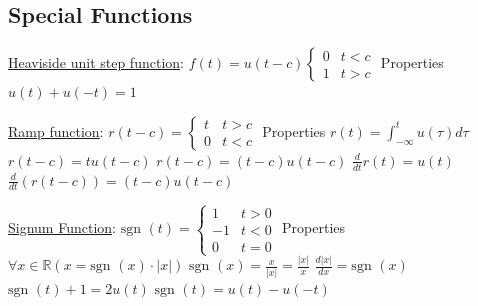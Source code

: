 \documentclass[12pt]{article}
\def\sgn{\text{sgn\ }} %
\begin{document}
\begin{flushleft}
	
	\pagebreak	
	
	
	\section{Special Functions}
	
	\uline{Heaviside unit step function}: $f(t) = u(t-c) \begin{cases} 0 & t < c \\ 1 & t > c \end{cases}$ \linebreak 
	Properties \linebreak 
	\textbullet \quad $u(t) + u(-t) = 1$ \linebreak 
	
	\uline{Ramp function}: $r(t-c) = \begin{cases} t & t > c \\ 0 & t < c \end{cases}$ \linebreak 
	Properties \linebreak 
	\textbullet \quad $r(t) = \int_{-\infty}^t u(\tau) d\tau	$ \linebreak 
	\textbullet \quad $r(t-c) = tu(t-c) $ \linebreak 
	\textbullet \quad $r(t-c) = (t-c) u(t-c) $ \linebreak 
	\textbullet \quad $\displaystyle \frac{d}{dt} r(t) = u(t) $ \linebreak 
	\textbullet \quad $\displaystyle \frac{d}{dt} \left( r(t-c) \right) = (t-c) u(t-c) $ \linebreak 
	
	\uline{Signum Function}: $ \sgn (t) =  \begin{cases} 1 & t>0 \\ -1 & t < 0 \\ 0 & t = 0 \end{cases} $ \linebreak 
	Properties \linebreak 
	\textbullet \quad $\forall x \in \mathbb{R} ( x= \sgn (x) \cdot |x| ) $ \linebreak 
	\textbullet \quad $ \sgn (x) = \frac{x}{|x|} = \frac{|x|}{x} $ \linebreak 
	\textbullet \quad $ \frac{d|x|}{dx} = \sgn (x) $ \linebreak 
	\textbullet \quad $ \sgn (t) + 1 = 2u(t) $ \linebreak 
	\textbullet \quad $ \sgn (t) = u(t) - u(-t) $ \linebreak 
	

\end{flushleft}
\end{document}
